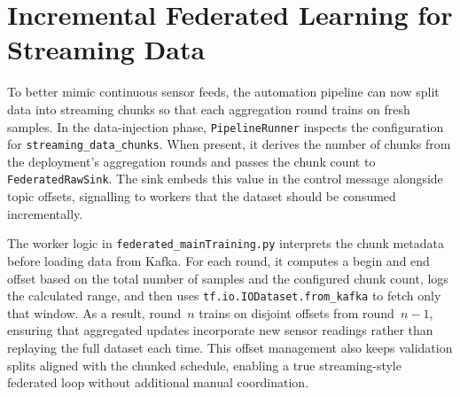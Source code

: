 \section{Incremental Federated Learning for Streaming Data}
\label{sec:incremental_federated}

To better mimic continuous sensor feeds, the automation pipeline can now split data into streaming chunks so that each aggregation round trains on fresh samples. In the data-injection phase, \texttt{PipelineRunner} inspects the configuration for \texttt{streaming\_data\_chunks}. When present, it derives the number of chunks from the deployment’s aggregation rounds and passes the chunk count to \texttt{FederatedRawSink}. The sink embeds this value in the control message alongside topic offsets, signalling to workers that the dataset should be consumed incrementally.

The worker logic in \texttt{federated\_mainTraining.py} interprets the chunk metadata before loading data from Kafka. For each round, it computes a begin and end offset based on the total number of samples and the configured chunk count, logs the calculated range, and then uses \texttt{tf.io.IODataset.from\_kafka} to fetch only that window. As a result, round~$n$ trains on disjoint offsets from round~$n-1$, ensuring that aggregated updates incorporate new sensor readings rather than replaying the full dataset each time. This offset management also keeps validation splits aligned with the chunked schedule, enabling a true streaming-style federated loop without additional manual coordination.

